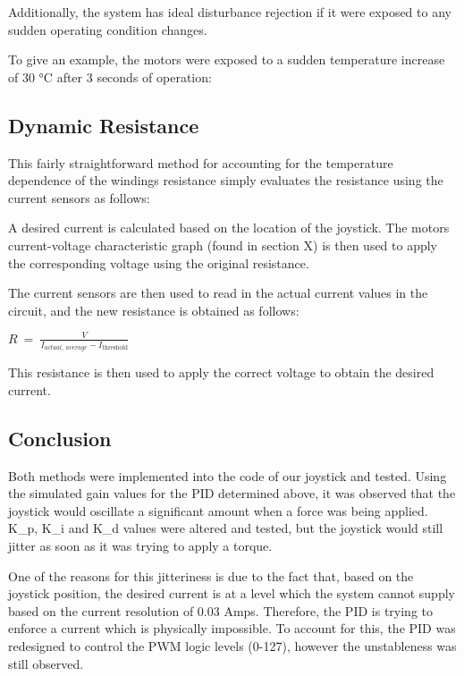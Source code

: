 Additionally, the system has ideal disturbance rejection if it were
exposed to any sudden operating condition changes.

To give an example, the motors were exposed to a sudden temperature
increase of 30 °C after 3 seconds of operation:


\subsection{Dynamic Resistance}\label{sub:dynamic-resistance}

This fairly straightforward method for accounting for the temperature
dependence of the windings resistance simply evaluates the resistance
using the current sensors as follows:

A desired current is calculated based on the location of the joystick.
The motors current-voltage characteristic graph (found in section X) is
then used to apply the corresponding voltage using the original
resistance.

The current sensors are then used to read in the actual current values
in the circuit, and the new resistance is obtained as follows:

\(R\  = \ \frac{V}{I_{actual,\ average} - I_{\text{threshold}}}\)

This resistance is then used to apply the correct voltage to obtain the
desired current.

\subsection{Conclusion}\label{sub:conclusion}

Both methods were implemented into the code of our joystick and tested.
Using the simulated gain values for the PID determined above, it was
observed that the joystick would oscillate a significant amount when a
force was being applied. K\_p, K\_i and K\_d values were altered and
tested, but the joystick would still jitter as soon as it was trying to
apply a torque.

One of the reasons for this jitteriness is due to the fact that, based
on the joystick position, the desired current is at a level which the
system cannot supply based on the current resolution of 0.03 Amps.
Therefore, the PID is trying to enforce a current which is physically
impossible. To account for this, the PID was redesigned to control the
PWM logic levels (0-127), however the unstableness was still observed.

